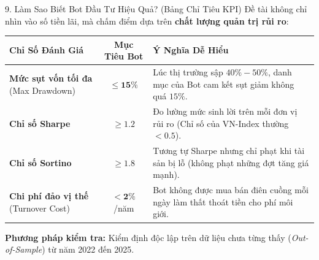 \documentclass[aspectratio=169, 10pt]{beamer}
\begin{document}
\begin{frame}{9. Làm Sao Biết Bot Đầu Tư Hiệu Quả? (Bảng Chỉ Tiêu KPI)}
  Đề tài không chỉ nhìn vào số tiền lãi, mà chấm điểm dựa trên \textbf{chất lượng quản trị rủi ro}:

  \vspace{1ex}
  \begin{table}[h]
    \centering
    \small
    \begin{tabular}{p{3.2cm} c p{7.5cm}}
      \toprule
      \textbf{Chỉ Số Đánh Giá} & \textbf{Mục Tiêu Bot} & \textbf{Ý Nghĩa Dễ Hiểu} \\
      \midrule
      \textbf{Mức sụt vốn tối đa} (Max Drawdown) & $\mathbf{\le 15\%}$ & Lúc thị trường sập $40\%-50\%$, danh mục của Bot cam kết sụt giảm không quá $15\%$. \\
      \midrule
      \textbf{Chỉ số Sharpe} & $\mathbf{\ge 1.2}$ & Đo lường mức sinh lời trên mỗi đơn vị rủi ro (Chỉ số của VN-Index thường $< 0.5$). \\
      \midrule
      \textbf{Chỉ số Sortino} & $\mathbf{\ge 1.8}$ & Tương tự Sharpe nhưng chỉ phạt khi tài sản bị lỗ (không phạt những đợt tăng giá mạnh). \\
      \midrule
      \textbf{Chi phí đảo vị thế} (Turnover Cost) & $\mathbf{< 2\%}$/năm & Bot không được mua bán điên cuồng mỗi ngày làm thất thoát tiền cho phí môi giới. \\
      \bottomrule
    \end{tabular}
  \end{table}

  \vspace{0.5ex}
  \begin{center}
    {\footnotesize \textbf{Phương pháp kiểm tra:}} Kiểm định độc lập trên dữ liệu chưa từng thấy (\textit{Out-of-Sample}) từ năm 2022 đến 2025.
  \end{center}
\end{frame}
\end{document}
